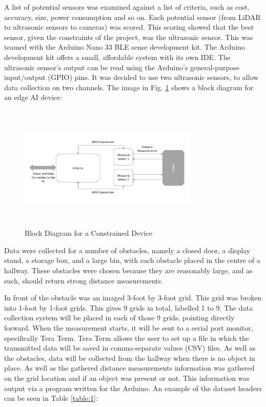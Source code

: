 \documentclass[conference]{IEEEtran}
\begin{document}
A list of potential sensors was examined against a list of criteria, such as cost, accuracy, size, power consumption and so on. Each potential sensor (from LiDAR to ultrasonic sensors to cameras) was scored. This scoring showed that the best sensor, given the constraints of the project, was the ultrasonic sensor. This was teamed with the Arduino Nano 33 BLE sense development kit. The Arduino development kit offers a small, affordable system with its own IDE. The ultrasonic sensor's output can be read using the Arduino's general-purpose input/output (GPIO) pins. It was decided to use two ultrasonic sensors, to allow data collection on two channels. The image in Fig. \ref{fig:collection1} shows a block diagram for an edge AI device:    
\begin{figure}[h]
\includegraphics[width=8.5cm, height=6cm]{images/data_collection_block.png}
\centering
\caption{Block Diagram for a Constrained Device}
\label{fig:collection1}
\end{figure}

Data were collected for a number of obstacles, namely a closed door, a display stand, a storage box, and a large bin, with each obstacle placed in the centre of a hallway. These obstacles were chosen because they are reasonably large, and as such, should return strong distance measurements. 

In front of the obstacle was an imaged 3-foot by 3-foot grid. This grid was broken into 1-foot by 1-foot grids. This gives 9 grids in total, labelled 1 to 9. The data collection system will be placed in each of those 9 grids, pointing directly forward. When the measurement starts, it will be sent to a serial port monitor, specifically Tera Term. Tera Term allows the user to set up a file in which the transmitted data will be saved in comma-separate values (CSV) files. As well as the obstacles, data will be collected from the hallway when there is no object in place. As well as the gathered distance measurements information was gathered on the grid location and if an object was present or not. This information was output via a program written for the Arduino. An example of the dataset headers can be seen in Table \ref{table:1}:
\end{document}
